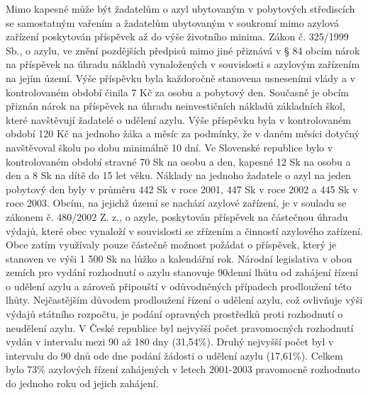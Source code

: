 \documentclass[10pt]{article}
\begin{document}
Mimo kapesné může být žadatelům o azyl ubytovaným v pobytových střediscích se samostatným vařením a žadatelům ubytovaným v soukromí mimo azylová zařízení poskytován příspěvek až do výše životního minima.
Zákon č. 325/1999 Sb., o azylu, ve znění pozdějších předpisů mimo jiné přiznává v § 84 obcím nárok na příspěvek na úhradu nákladů vynaložených v souvislosti s azylovým zařízením na jejím území.
Výše příspěvku byla každoročně stanovena usneseními vlády a v kontrolovaném období činila 7 Kč za osobu a pobytový den.
Současně je obcím přiznán nárok na příspěvek na úhradu neinvestičních nákladů základních škol, které navštěvují žadatelé o udělení azylu.
Výše příspěvku byla v kontrolovaném období 120 Kč na jednoho žáka a měsíc za podmínky, že v daném měsíci dotyčný navštěvoval školu po dobu minimálně 10 dní.
Ve Slovenské republice bylo v kontrolovaném období stravné 70 Sk na osobu a den, kapesné 12 Sk na osobu a den a 8 Sk na dítě do 15 let věku.
Náklady na jednoho žadatele o azyl na jeden pobytový den byly v průměru 442 Sk v roce 2001, 447 Sk v roce 2002 a 445 Sk v roce 2003.
Obcím, na jejichž území se nachází azylové zařízení, je v souladu se zákonem č. 480/2002 Z. z., o azyle, poskytován příspěvek na částečnou úhradu výdajů, které obec vynaloží v souvislosti se zřízením a činností azylového zařízení.
Obce zatím využívaly pouze částečně možnost požádat o příspěvek, který je stanoven ve výši 1 500 Sk na lůžko a kalendářní rok.
Národní legislativa v obou zemích pro vydání rozhodnutí o azylu stanovuje 90denní lhůtu od zahájení řízení o udělení azylu a zároveň připouští v odůvodněných případech prodloužení této lhůty.
Nejčastějším důvodem prodloužení řízení o udělení azylu, což ovlivňuje výši výdajů státního rozpočtu, je podání opravných prostředků proti rozhodnutí o neudělení azylu.
V České republice byl nejvyšší počet pravomocných rozhodnutí vydán v intervalu mezi 90 až 180 dny (31,54\%).
Druhý nejvyšší počet byl v intervalu do 90 dnů ode dne podání žádosti o udělení azylu (17,61\%).
Celkem bylo 73\% azylových řízení zahájených v letech 2001-2003 pravomocně rozhodnuto do jednoho roku od jejich zahájení.
\end{document}
